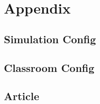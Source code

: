 \chapter{Appendix}

\label{ApxSimulationConfig}
\section{Simulation Config}


\label{ApxClassroomProfile}
\section{Classroom Config}


\section{Article}
 